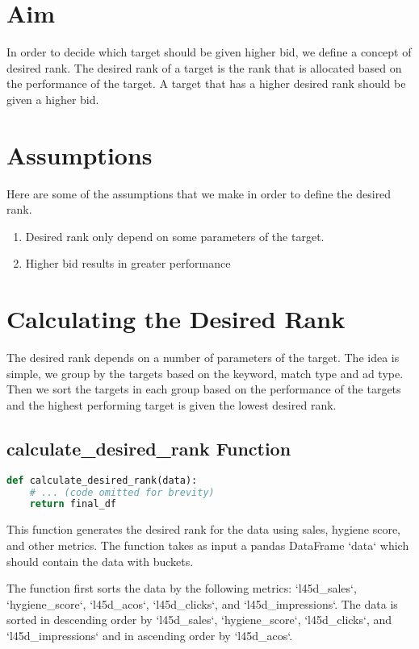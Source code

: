 \section{Aim}

In order to decide which target should be given higher bid, we define a concept of desired rank. The desired rank of a target is the rank that is allocated based on the performance of the target. A target that has a higher desired rank should be given a higher bid.

\section{Assumptions}

Here are some of the assumptions that we make in order to define the desired rank.

\begin{enumerate}
    \item Desired rank only depend on some parameters of the target.
    \item Higher bid results in greater performance
\end{enumerate}

\section{Calculating the Desired Rank}

The desired rank depends on a number of parameters of the target. The idea is simple, we group by the targets based on the keyword, match type and ad type. Then we sort the targets in each group based on the performance of the targets and the highest performing target is given the lowest desired rank.

\subsection{calculate\_desired\_rank Function}

\begin{lstlisting}[language=Python]
def calculate_desired_rank(data):
    # ... (code omitted for brevity)
    return final_df
\end{lstlisting}

This function generates the desired rank for the data using sales, hygiene score, and other metrics. The function takes as input a pandas DataFrame `data` which should contain the data with buckets.

The function first sorts the data by the following metrics: `l45d\_sales`, `hygiene\_score`, `l45d\_acos`, `l45d\_clicks`, and `l45d\_impressions`. The data is sorted in descending order by `l45d\_sales`, `hygiene\_score`, `l45d\_clicks`, and `l45d\_impressions` and in ascending order by `l45d\_acos`.

